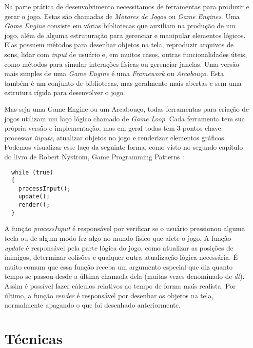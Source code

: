 Na parte prática de desenvolvimento necessitamos de ferramentas para produzir e gerar o jogo. Estas são chamadas de \textit{Motores de Jogos} ou \textit{Game Engines}. Uma \textit{Game Engine} consiste em várias bibliotecas que auxiliam na produção de um jogo, além de alguma estruturação para gerenciar e manipular elementos lógicos. Elas possuem métodos para desenhar objetos na tela, reproduzir arquivos de sons, lidar com \textit{input} de usuário e, em muitos casos, outras funcionalidades úteis, como métodos para simular interações físicas ou gerenciar janelas. Uma versão mais simples de uma \textit{Game Engine} é uma \textit{Framework} ou \textit{Arcabouço}. Esta também é um conjunto de bibliotecas, mas geralmente mais abertas e sem uma estrutura rígida para desenvolver o jogo.

Mas seja uma Game Engine ou um Arcabouço, todas ferramentas para criação de jogos utilizam um laço lógico chamado de \textit{Game Loop}. Cada ferramenta tem sua própria versão e implementação, mas em geral todas tem 3 pontos chave: processar \textit{inputs}, atualizar objetos no jogo e renderizar elementos gráficos. Podemos visualizar esse laço da seguinte forma, como visto no segundo capítulo do livro de Robert Nystrom, Game Programming Patterns \cite{robertgameloop}:

\begin{lstlisting}
  while (true)
  {
    processInput();
    update();
    render();
  }
\end{lstlisting}

A função \textit{processInput} é responsável por verificar se o usuário pressionou alguma tecla ou de algum modo fez algo no mundo físico que afete o jogo. A função \textit{update} é responsável pela parte lógica do jogo, como atualizar as posições de inimigos, determinar colisões e qualquer outra atualização lógica necessária. É muito comum que essa função receba um argumento especial que diz quanto tempo se passou desde a última chamada dela (muitas vezes denominado de \textit{dt}). Assim é possível fazer cálculos relativos ao tempo de forma mais realista. Por último, a função \textit{render} é responsável por desenhar os objetos na tela, normalmente apagando o que foi desenhado anteriormente.


\section{Técnicas}
\label{sec:tecnicas}

